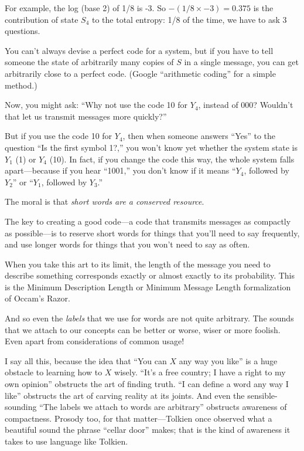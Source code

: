 {
 For example, the log (base 2) of 1/8 is -3. So $-(1/8
\times -3) = 0.375$ is the contribution of state
$S_{4}$ to the total entropy: 1/8 of the time, we have to
ask 3 questions.}

{
 You can't always devise a perfect code for a
system, but if you have to tell someone the state of arbitrarily many
copies of $S$ in a single message, you can get arbitrarily close to a
perfect code. (Google ``arithmetic
coding'' for a simple method.)}

{
 Now, you might ask: ``Why not use the code 10 for
$Y_{4}$, instead of 000? Wouldn't that let
us transmit messages more quickly?''}

{
 But if you use the code 10 for $Y_{4}$, then when
someone answers ``Yes'' to the
question ``Is the first symbol 1?,''
you won't know yet whether the system state is
$Y_{1}$ (1) or $Y_{4}$ (10). In fact, if you
change the code this way, the whole system falls apart---because if you
hear ``1001,'' you
don't know if it means
``$Y_{4}$, followed by
$Y_{2}$'' or
``$Y_{1}$, followed by
$Y_{3}$.''}

{
 The moral is that \textit{short words are a conserved resource}.}

{
 The key to creating a good code---a code that transmits messages
as compactly as possible---is to reserve short words for things that
you'll need to say frequently, and use longer words for
things that you won't need to say as often.}

{
 When you take this art to its limit, the length of the message you
need to describe something corresponds exactly or almost exactly to its
probability. This is the Minimum Description Length or Minimum Message
Length formalization of Occam's Razor.}

{
 And so even the \textit{labels} that we use for words are not
quite arbitrary. The sounds that we attach to our concepts can be
better or worse, wiser or more foolish. Even apart from considerations
of common usage!}

{
 I say all this, because the idea that ``You can $X$
any way you like'' is a huge obstacle to learning how
to $X$ wisely. ``It's a free country; I
have a right to my own opinion'' obstructs the art of
finding truth. ``I can define a word any way I
like'' obstructs the art of carving reality at its
joints. And even the sensible-sounding ``The labels we
attach to words are arbitrary'' obstructs awareness
of compactness. Prosody too, for that matter---Tolkien once observed
what a beautiful sound the phrase ``cellar
door'' makes; that is the kind of awareness it takes
to use language like Tolkien.}

